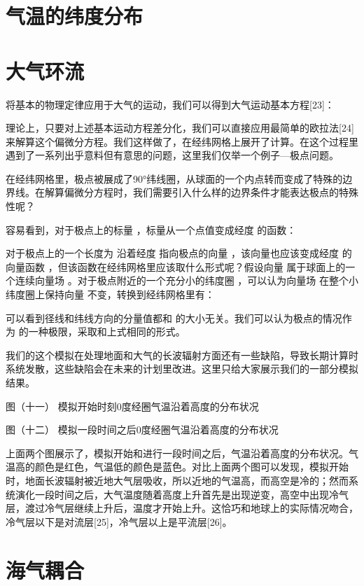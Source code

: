 \documentclass[a4paper,10.5pt]{book}
\begin{document}
\section{气温的纬度分布}

\section{大气环流}

将基本的物理定律应用于大气的运动，我们可以得到大气运动基本方程[23]：



理论上，只要对上述基本运动方程差分化，我们可以直接应用最简单的欧拉法[24]来解算这个偏微分方程。我们这样做了，在经纬网格上展开了计算。在这个过程里遇到了一系列出乎意料但有意思的问题，这里我们仅举一个例子—极点问题。

在经纬网格里，极点被展成了90°纬线圈，从球面的一个内点转而变成了特殊的边界线。在解算偏微分方程时，我们需要引入什么样的边界条件才能表达极点的特殊性呢？

容易看到，对于极点上的标量  ，标量从一个点值变成经度  的函数：



对于极点上的一个长度为  沿着经度  指向极点的向量  ，该向量也应该变成经度  的向量函数  ，但该函数在经纬网格里应该取什么形式呢？假设向量  属于球面上的一个连续向量场  。对于极点附近的一个充分小的纬度圈 ，可以认为向量场  在整个小纬度圈上保持向量  不变，转换到经纬网格里有：



可以看到径线和纬线方向的分量值都和  的大小无关。我们可以认为极点的情况作为  的一种极限，采取和上式相同的形式。

我们的这个模拟在处理地面和大气的长波辐射方面还有一些缺陷，导致长期计算时系统发散，这些缺陷会在未来的计划里改进。这里只给大家展示我们的一部分模拟结果。


图（十一）
模拟开始时刻0度经圈气温沿着高度的分布状况



图（十二）
模拟一段时间之后0度经圈气温沿着高度的分布状况

上面两个图展示了，模拟开始和进行一段时间之后，气温沿着高度的分布状况。气温高的颜色是红色，气温低的颜色是蓝色。对比上面两个图可以发现，模拟开始时，地面长波辐射被近地大气层吸收，所以近地的气温高，而高空是冷的；然而系统演化一段时间之后，大气温度随着高度上升首先是出现逆变，高空中出现冷气层，渡过冷气层继续上升后，温度才开始上升。这恰巧和地球上的实际情况吻合，冷气层以下是对流层[25]，冷气层以上是平流层[26]。

\section{海气耦合}
\end{document}
